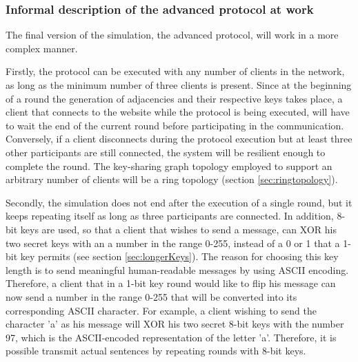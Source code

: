 \subsubsection{Informal description of the advanced protocol at work}
\noindent The final version of the simulation, the advanced protocol, will work in a more complex manner. 

Firstly, the protocol can be executed with any number of clients in the network, as long as the minimum number of three clients is present. Since at the beginning of a round the generation of adjacencies and their respective keys takes place, a client that connects to the website while the protocol is being executed, will have to wait the end of the current round before participating in the communication. Conversely, if a client disconnects during the protocol execution but at least three other participants are still connected, the system will be resilient enough to complete the round. The key-sharing graph topology employed to support an arbitrary number of clients will be a ring topology (section \ref{sec:ringtopology}). \newline

Secondly, the simulation does not end after the execution of a single round, but it keeps repeating itself as long as three participants are connected. In addition, 8-bit keys are used, so that a client that wishes to send a message, can XOR his two secret keys with an a number in the range 0-255, instead of a 0 or 1 that a 1-bit key permits (see section \ref{sec:longerKeys}). The reason for choosing this key length is to send meaningful human-readable messages by using ASCII encoding. Therefore, a client that in a 1-bit key round would like to flip his message can now send a number in the range 0-255 that will be converted into its corresponding ASCII character. For example, a client wishing to send the character 'a' as his message will XOR his two secret 8-bit keys with the number 97, which is the ASCII-encoded representation of the letter 'a'. Therefore, it is possible transmit actual sentences by repeating rounds with 8-bit keys. \newline

